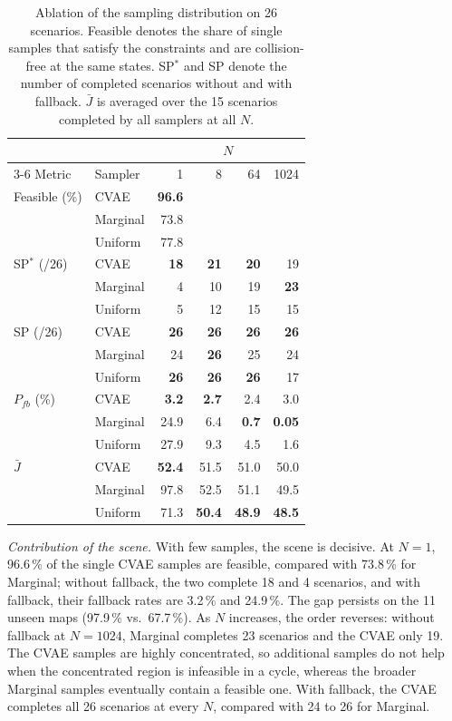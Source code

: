 \begin{table}[t]
  \centering
  \caption{Ablation of the sampling distribution on 26 scenarios. Feasible denotes the share of single samples that satisfy the constraints and are collision-free at the same states. SP$^*$ and SP denote the number of completed scenarios without and with fallback. $\bar{J}$ is averaged over the 15 scenarios completed by all samplers at all $N$.}
  \label{tab:ablation}
  \begin{tabular}{llrrrr}
    \toprule
    & & \multicolumn{4}{c}{$N$} \\
    \cmidrule(lr){3-6}
    Metric & Sampler & 1 & 8 & 64 & 1024 \\
    \midrule
    Feasible (\%) & CVAE     & \textbf{96.6} & & & \\
                  & Marginal & 73.8 & & & \\
                  & Uniform  & 77.8 & & & \\
    \midrule
    SP$^*$ (/26)  & CVAE     & \textbf{18} & \textbf{21} & \textbf{20} & 19 \\
                  & Marginal & 4  & 10 & 19 & \textbf{23} \\
                  & Uniform  & 5  & 12 & 15 & 15 \\
    \midrule
    SP (/26)      & CVAE     & \textbf{26} & \textbf{26} & \textbf{26} & \textbf{26} \\
                  & Marginal & 24 & \textbf{26} & 25 & 24 \\
                  & Uniform  & \textbf{26} & \textbf{26} & \textbf{26} & 17 \\
    \midrule
    $P_{fb}$ (\%) & CVAE     & \textbf{3.2} & \textbf{2.7} & 2.4 & 3.0 \\
                  & Marginal & 24.9 & 6.4 & \textbf{0.7} & \textbf{0.05} \\
                  & Uniform  & 27.9 & 9.3 & 4.5 & 1.6 \\
    \midrule
    $\bar{J}$     & CVAE     & \textbf{52.4} & 51.5 & 51.0 & 50.0 \\
                  & Marginal & 97.8 & 52.5 & 51.1 & 49.5 \\
                  & Uniform  & 71.3 & \textbf{50.4} & \textbf{48.9} & \textbf{48.5} \\
    \bottomrule
  \end{tabular}
\end{table}

\textit{Contribution of the scene.}
With few samples, the scene is decisive.
At $N = 1$, 96.6\,\% of the single CVAE samples are feasible, compared with 73.8\,\% for Marginal; without fallback, the two complete 18 and 4 scenarios, and with fallback, their fallback rates are 3.2\,\% and 24.9\,\%.
The gap persists on the 11 unseen maps (97.9\,\% vs.\ 67.7\,\%).
As $N$ increases, the order reverses: without fallback at $N = 1024$, Marginal completes 23 scenarios and the CVAE only 19.
The CVAE samples are highly concentrated, so additional samples do not help when the concentrated region is infeasible in a cycle, whereas the broader Marginal samples eventually contain a feasible one.
With fallback, the CVAE completes all 26 scenarios at every $N$, compared with 24 to 26 for Marginal.

